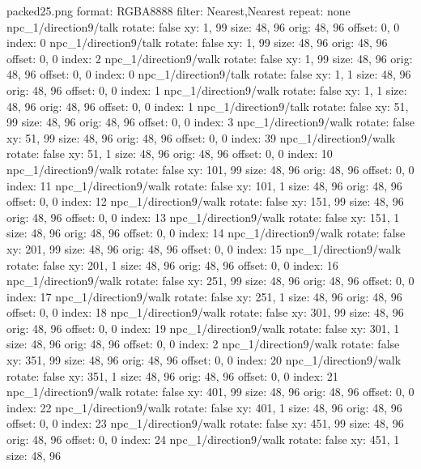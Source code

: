 packed25.png
format: RGBA8888
filter: Nearest,Nearest
repeat: none
npc_1/direction9/talk
  rotate: false
  xy: 1, 99
  size: 48, 96
  orig: 48, 96
  offset: 0, 0
  index: 0
npc_1/direction9/talk
  rotate: false
  xy: 1, 99
  size: 48, 96
  orig: 48, 96
  offset: 0, 0
  index: 2
npc_1/direction9/walk
  rotate: false
  xy: 1, 99
  size: 48, 96
  orig: 48, 96
  offset: 0, 0
  index: 0
npc_1/direction9/talk
  rotate: false
  xy: 1, 1
  size: 48, 96
  orig: 48, 96
  offset: 0, 0
  index: 1
npc_1/direction9/walk
  rotate: false
  xy: 1, 1
  size: 48, 96
  orig: 48, 96
  offset: 0, 0
  index: 1
npc_1/direction9/talk
  rotate: false
  xy: 51, 99
  size: 48, 96
  orig: 48, 96
  offset: 0, 0
  index: 3
npc_1/direction9/walk
  rotate: false
  xy: 51, 99
  size: 48, 96
  orig: 48, 96
  offset: 0, 0
  index: 39
npc_1/direction9/walk
  rotate: false
  xy: 51, 1
  size: 48, 96
  orig: 48, 96
  offset: 0, 0
  index: 10
npc_1/direction9/walk
  rotate: false
  xy: 101, 99
  size: 48, 96
  orig: 48, 96
  offset: 0, 0
  index: 11
npc_1/direction9/walk
  rotate: false
  xy: 101, 1
  size: 48, 96
  orig: 48, 96
  offset: 0, 0
  index: 12
npc_1/direction9/walk
  rotate: false
  xy: 151, 99
  size: 48, 96
  orig: 48, 96
  offset: 0, 0
  index: 13
npc_1/direction9/walk
  rotate: false
  xy: 151, 1
  size: 48, 96
  orig: 48, 96
  offset: 0, 0
  index: 14
npc_1/direction9/walk
  rotate: false
  xy: 201, 99
  size: 48, 96
  orig: 48, 96
  offset: 0, 0
  index: 15
npc_1/direction9/walk
  rotate: false
  xy: 201, 1
  size: 48, 96
  orig: 48, 96
  offset: 0, 0
  index: 16
npc_1/direction9/walk
  rotate: false
  xy: 251, 99
  size: 48, 96
  orig: 48, 96
  offset: 0, 0
  index: 17
npc_1/direction9/walk
  rotate: false
  xy: 251, 1
  size: 48, 96
  orig: 48, 96
  offset: 0, 0
  index: 18
npc_1/direction9/walk
  rotate: false
  xy: 301, 99
  size: 48, 96
  orig: 48, 96
  offset: 0, 0
  index: 19
npc_1/direction9/walk
  rotate: false
  xy: 301, 1
  size: 48, 96
  orig: 48, 96
  offset: 0, 0
  index: 2
npc_1/direction9/walk
  rotate: false
  xy: 351, 99
  size: 48, 96
  orig: 48, 96
  offset: 0, 0
  index: 20
npc_1/direction9/walk
  rotate: false
  xy: 351, 1
  size: 48, 96
  orig: 48, 96
  offset: 0, 0
  index: 21
npc_1/direction9/walk
  rotate: false
  xy: 401, 99
  size: 48, 96
  orig: 48, 96
  offset: 0, 0
  index: 22
npc_1/direction9/walk
  rotate: false
  xy: 401, 1
  size: 48, 96
  orig: 48, 96
  offset: 0, 0
  index: 23
npc_1/direction9/walk
  rotate: false
  xy: 451, 99
  size: 48, 96
  orig: 48, 96
  offset: 0, 0
  index: 24
npc_1/direction9/walk
  rotate: false
  xy: 451, 1
  size: 48, 96
